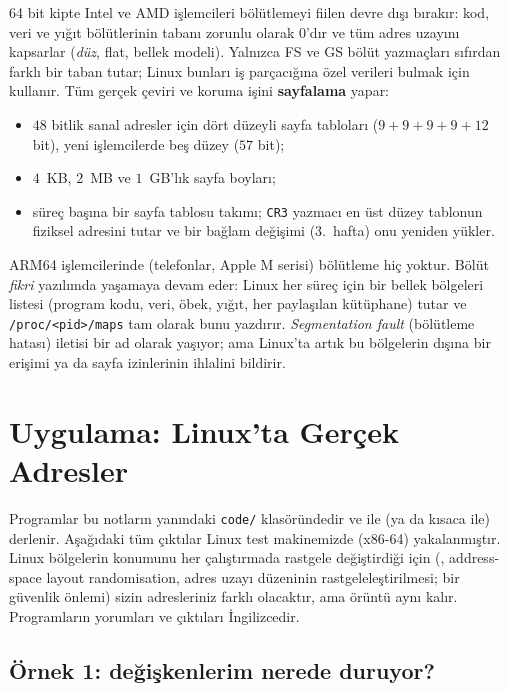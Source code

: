 64 bit kipte Intel ve AMD işlemcileri bölütlemeyi fiilen devre dışı bırakır: kod, veri ve yığıt bölütlerinin tabanı zorunlu olarak $0$'dır ve tüm adres uzayını kapsarlar (\emph{düz}, flat, bellek modeli). Yalnızca FS ve GS bölüt yazmaçları sıfırdan farklı bir taban tutar; Linux bunları iş parçacığına özel verileri bulmak için kullanır. Tüm gerçek çeviri ve koruma işini \textbf{sayfalama} yapar:
\begin{itemize}
  \item $48$ bitlik sanal adresler için dört düzeyli sayfa tabloları ($9+9+9+9+12$ bit), yeni işlemcilerde beş düzey ($57$ bit);
  \item $4$~KB, $2$~MB ve $1$~GB'lık sayfa boyları;
  \item süreç başına bir sayfa tablosu takımı; \texttt{CR3} yazmacı en üst düzey tablonun fiziksel adresini tutar ve bir bağlam değişimi (3.~hafta) onu yeniden yükler.
\end{itemize}
ARM64 işlemcilerinde (telefonlar, Apple M serisi) bölütleme hiç yoktur. Bölüt \emph{fikri} yazılımda yaşamaya devam eder: Linux her süreç için bir bellek bölgeleri listesi (program kodu, veri, öbek, yığıt, her paylaşılan kütüphane) tutar ve \texttt{/proc/<pid>/maps} tam olarak bunu yazdırır. \emph{Segmentation fault} (bölütleme hatası) iletisi bir ad olarak yaşıyor; ama Linux'ta artık bu bölgelerin dışına bir erişimi ya da sayfa izinlerinin ihlalini bildirir.

\section{Uygulama: Linux'ta Gerçek Adresler}
\label{sec:handson}

Programlar bu notların yanındaki \texttt{code/} klasöründedir ve  ile (ya da kısaca  ile) derlenir. Aşağıdaki tüm çıktılar Linux test makinemizde (x86-64) yakalanmıştır. Linux bölgelerin konumunu her çalıştırmada rastgele değiştirdiği için (, address-space layout randomisation, adres uzayı düzeninin rastgeleleştirilmesi; bir güvenlik önlemi) sizin adresleriniz farklı olacaktır, ama örüntü aynı kalır. Programların yorumları ve çıktıları İngilizcedir.

\subsection{Örnek 1: değişkenlerim nerede duruyor?}

